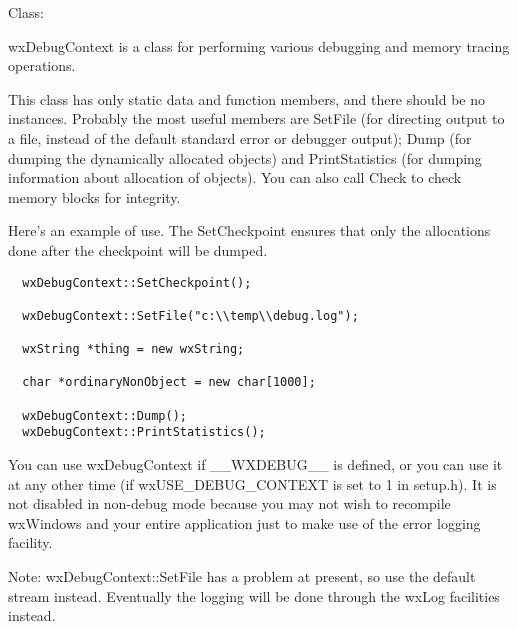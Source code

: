 Class: 

wxDebugContext is a class for performing various debugging and memory tracing
operations.

This class has only static data and function members, and there should be
no instances. Probably the most useful members are SetFile (for directing output
to a file, instead of the default standard error or debugger output);
Dump (for dumping the dynamically allocated objects) and PrintStatistics
(for dumping information about allocation of objects). You can also call
Check to check memory blocks for integrity.

Here's an example of use. The SetCheckpoint ensures that only the
allocations done after the checkpoint will be dumped.

\begin{verbatim}
  wxDebugContext::SetCheckpoint();

  wxDebugContext::SetFile("c:\\temp\\debug.log");

  wxString *thing = new wxString;

  char *ordinaryNonObject = new char[1000];

  wxDebugContext::Dump();
  wxDebugContext::PrintStatistics();
\end{verbatim}

You can use wxDebugContext if \_\_WXDEBUG\_\_ is defined, or you can use it
at any other time (if wxUSE\_DEBUG\_CONTEXT is set to 1 in setup.h). It is not disabled
in non-debug mode because you may not wish to recompile wxWindows and your entire application
just to make use of the error logging facility.

Note: wxDebugContext::SetFile has a problem at present, so use the default stream instead.
Eventually the logging will be done through the wxLog facilities instead.

